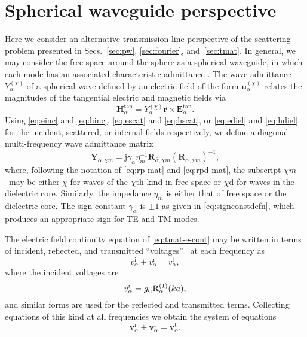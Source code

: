 \documentclass[article]{IEEEtran}
\newcommand{\M}[1]{\mathbf{#1}}
\newcommand{\T}[1]{\mathrm{#1}}
\newcommand{\V}[1]{\boldsymbol{#1}}
\renewcommand{\u}[1]{\boldsymbol{\hat{#1}}}
\newcommand{\rbkind}{\chi}
\begin{document}
\section{Spherical waveguide perspective}
\label{sec:tl}
Here we consider an alternative transmission line perspective of the scattering problem presented in Secs.~\ref{sec:pw}, \ref{sec:fourier}, and~\ref{sec:tmat}. In general, we may consider the free space around the sphere as a spherical waveguide, in which each mode has an associated characteristic  admittance \cite{harrington2001time}. 
The wave admittance $Y_\alpha^{(\rbkind)}$ of a spherical wave defined by an electric field of the form $\V{u}_\alpha^{(\rbkind)}$ relates the magnitudes of the tangential electric and magnetic fields via
\begin{equation}
    \V{H}^{\T{tan}}_\alpha = Y^{(\rbkind)}_\alpha \u{r}\times\V{E}^{\T{tan}}_\alpha.
\end{equation}
Using \eqref{eq:einc} and \eqref{eq:hinc}, \eqref{eq:escat} and \eqref{eq:hscat}, or \eqref{eq:ediel} and \eqref{eq:hdiel} for the incident, scattered, or internal fields respectively, we define a diagonal multi-frequency wave admittance matrix
\begin{equation}
    \M{Y}_{\alpha,\rbkind m} = \T{j}\gamma_\alpha\eta_m^{-1}\M{R}_{\bar{\alpha}, \rbkind m} (\M{R}_{\alpha, \rbkind m})^{-1},
    \label{eq:admittance-mat}
\end{equation}
where, following the notation of \eqref{eq:rp-mat} and \eqref{eq:rpd-mat}, the subscript $\rbkind m$%
~may be either $\rbkind$ for waves of the $\rbkind$th kind in free space or $\rbkind\T{d}$ for waves in the dielectric core. Similarly, the impedance $\eta_m$ is either that of free space or the dielectric core. The sign constant $\gamma_\alpha$ is $\pm 1$ as given in \eqref{eq:signconstdefn}, which produces an appropriate sign for TE and TM modes.

The electric field continuity equation of \eqref{eq:tmat-e-cont} may be written in terms of incident, reflected, and transmitted ``voltages''%
~at each frequency as 
\begin{equation}
    v^\T{i}_\alpha + v^\T{r}_\alpha = v^\T{t}_\alpha,
    \label{eq:tline-e-cont}
\end{equation}
where the incident voltages are
\begin{equation}
    v^\T{i}_\alpha = g_\alpha\Ra^{(1)}(ka),
\end{equation}
and similar forms are used for the reflected and transmitted terms.  Collecting equations of this kind at all frequencies we obtain the system of equations
\begin{equation}
    \M{v}_\alpha^\T{i} + \M{v}_\alpha^\T{r} = \M{v}^\T{t}_\alpha.
\end{equation}
\end{document}

